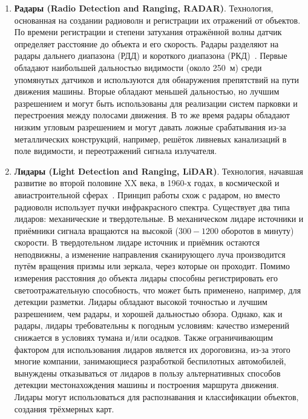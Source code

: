 \begin{enumerate}
	
\item \textbf{Радары (Radio Detection and Ranging, RADAR)}. Технология, основанная на создании радиоволн и регистрации их отражений от объектов. По времени регистрации и степени затухания отражённой волны датчик определяет расстояние до объекта и его скорость. Радары разделяют на радары дальнего диапазона (РДД) и короткого диапазона (РКД)~\cite{сысоева2007актуальные}. Первые обладают наибольшей дальностью видимости (около 250~м) среди упомянутых датчиков и используются для обнаружения препятствий на пути движения машины. Вторые обладают меньшей дальностью, но лучшим разрешением и могут быть использованы для реализации систем парковки и перестроения между полосами движения. В то же время радары обладают низким угловым разрешением и могут давать ложные срабатывания из-за металлических конструкций, например, решёток ливневых канализаций в поле видимости, и переотражений сигнала излучателя. 
	
\item \textbf{Лидары (Light Detection and Ranging, LiDAR)}. Технология, начавшая развитие во второй половине XX века, в 1960-х годах, в космической и авиастроительной сферах~\cite{wandinger2005introduction}. Принцип работы схож с радаром, но вместо радиоволн использует пучки инфракрасного спектра. Существует два типа лидаров: механические и твердотельные. В механическом лидаре источники и приёмники сигнала вращаются на высокой ($300-1200$ оборотов в минуту) скорости. В твердотельном лидаре источник и приёмник остаются неподвижны, а изменение направления сканирующего луча производится путём вращения призмы или зеркала, через которые он проходит. Помимо измерения расстояния до объекта лидары способны регистрировать его светоотражательную способность, что может быть применено, например, для детекции разметки. Лидары обладают высокой точностью и лучшим разрешением, чем радары, и хорошей дальностью обзора. Однако, как и радары, лидары требовательны к погодным условиям: качество измерений снижается в условиях тумана и/или осадков. Также ограничивающим фактором для использования лидаров является их дороговизна, из-за этого многие компании, занимающиеся разработкой беспилотных автомобилей, вынуждены отказываться от лидаров в пользу альтернативных способов детекции местонахождения машины и построения маршрута движения. Лидары могут использоваться для распознавания и классификации объектов, создания трёхмерных карт.	


\end{enumerate}
